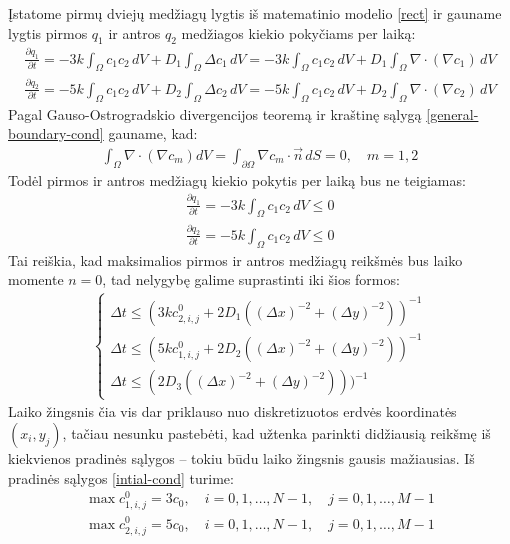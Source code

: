 Įstatome pirmų dviejų medžiagų lygtis iš matematinio modelio \eqref{rect} ir gauname lygtis pirmos $q_1$ ir antros $q_2$ medžiagos kiekio pokyčiams per laiką:
\begin{align}
  \frac{\partial q_1}{\partial t}
  =-3k\int_\Omega c_1c_2\,dV 
  + D_1\int_\Omega \Delta c_1\,dV
  =-3k\int_\Omega c_1c_2\,dV 
  + D_1\int_\Omega \nabla \cdot (\nabla c_1)\,dV\\
  \frac{\partial q_2}{\partial t}
  =-5k\int_\Omega c_1c_2\,dV 
  + D_2\int_\Omega \Delta c_2\,dV
  =-5k\int_\Omega c_1c_2\,dV 
  + D_2\int_\Omega \nabla \cdot (\nabla c_2)\,dV
\end{align}
\newpage
Pagal Gauso-Ostrogradskio divergencijos teoremą ir kraštinę sąlygą \eqref{general-boundary-cond} gauname, kad:
\begin{align}\label{no-q-change}
\int_\Omega \nabla \cdot (\nabla c_m) dV = \int_{\partial\Omega} \nabla c_m \cdot \vec{n}\, dS = 0,\quad m=1,2
\end{align}
Todėl pirmos ir antros medžiagų kiekio pokytis per laiką bus ne teigiamas:
\begin{subequations} \label{negative-quantity}
\begin{align}
  \frac{\partial q_1}{\partial t}=-3k\int_\Omega c_1c_2\,dV \leqslant 0\\
  \frac{\partial q_2}{\partial t}=-5k\int_\Omega c_1c_2\,dV\leqslant 0
\end{align}
\end{subequations}
Tai reiškia, kad maksimalios pirmos ir antros medžiagų reikšmės bus laiko momente $n=0$, tad nelygybę galime suprastinti iki šios formos:
\begin{align}
  \begin{cases}
    \Delta t \leqslant (3kc^{0}_{2,i,j}+2D_1((\Delta x)^{-2}+(\Delta y)^{-2}))^{-1}\\
    \Delta t \leqslant (5kc^{0}_{1,i,j}+2D_2((\Delta x)^{-2}+(\Delta y)^{-2}))^{-1}\\
    \Delta t \leqslant (2D_3((\Delta x)^{-2}+(\Delta y)^{-2})))^{-1}
  \end{cases}
\end{align}
Laiko žingsnis čia vis dar priklauso nuo diskretizuotos erdvės koordinatės $(x_i, y_j)$, tačiau nesunku pastebėti, kad užtenka parinkti didžiausią reikšmę iš kiekvienos pradinės sąlygos -- tokiu būdu laiko žingsnis gausis mažiausias. Iš pradinės sąlygos \eqref{intial-cond} turime:
\begin{align*}
\max c^0_{1,i,j}=3c_0,\quad i=0,1,\dots,N-1, \quad j=0,1,\dots,M-1\\
\max c^0_{2,i,j}=5c_0,\quad i=0,1,\dots,N-1, \quad j=0,1,\dots,M-1
\end{align*}
